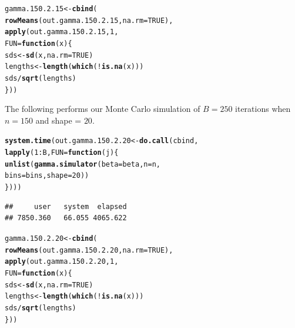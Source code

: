 \documentclass[11pt]{article}\usepackage[]{graphicx}\usepackage[]{color}
\makeatletter
\newcommand{\hlnum}[1]{\textcolor[rgb]{0.686,0.059,0.569}{#1}}%
\newcommand{\hlopt}[1]{\textcolor[rgb]{0,0,0}{#1}}%
\newcommand{\hlstd}[1]{\textcolor[rgb]{0.345,0.345,0.345}{#1}}%
\newcommand{\hlkwa}[1]{\textcolor[rgb]{0.161,0.373,0.58}{\textbf{#1}}}%
\newcommand{\hlkwb}[1]{\textcolor[rgb]{0.69,0.353,0.396}{#1}}%
\newcommand{\hlkwc}[1]{\textcolor[rgb]{0.333,0.667,0.333}{#1}}%
\newcommand{\hlkwd}[1]{\textcolor[rgb]{0.737,0.353,0.396}{\textbf{#1}}}%
\newenvironment{kframe}{%
 \def\at@end@of@kframe{}%
 \ifinner\ifhmode%
  \def\at@end@of@kframe{\end{minipage}}%
  \begin{minipage}{\columnwidth}%
 \fi\fi%
 \def\FrameCommand##1{\hskip\@totalleftmargin \hskip-\fboxsep
 \colorbox{shadecolor}{##1}\hskip-\fboxsep
     \hskip-\linewidth \hskip-\@totalleftmargin \hskip\columnwidth}%
 \MakeFramed {\advance\hsize-\width
   \@totalleftmargin\z@ \linewidth\hsize
   \@setminipage}}%
 {\par\unskip\endMakeFramed%
 \at@end@of@kframe}
\newenvironment{knitrout}{}{} %
\makeatother
\begin{document}
\begin{knitrout}
\color{fgcolor}\begin{kframe}
\begin{alltt}
\hlstd{gamma.150.2.15} \hlkwb{<-} \hlkwd{cbind}\hlstd{(}
  \hlkwd{rowMeans}\hlstd{(out.gamma.150.2.15,} \hlkwc{na.rm} \hlstd{=} \hlnum{TRUE}\hlstd{),}
  \hlkwd{apply}\hlstd{(out.gamma.150.2.15,} \hlnum{1}\hlstd{,}
  \hlkwc{FUN} \hlstd{=} \hlkwa{function}\hlstd{(}\hlkwc{x}\hlstd{)\{}
    \hlstd{sds} \hlkwb{<-} \hlkwd{sd}\hlstd{(x,} \hlkwc{na.rm} \hlstd{=} \hlnum{TRUE}\hlstd{)}
    \hlstd{lengths} \hlkwb{<-} \hlkwd{length}\hlstd{(}\hlkwd{which}\hlstd{(}\hlopt{!}\hlkwd{is.na}\hlstd{(x)))}
    \hlstd{sds} \hlopt{/} \hlkwd{sqrt}\hlstd{(lengths)}
  \hlstd{\}))}
\end{alltt}
\end{kframe}
\end{knitrout}

The following performs our Monte Carlo simulation of $B = 250$ iterations 
when $n = 150$ and shape = $20$.

\begin{knitrout}
\color{fgcolor}\begin{kframe}
\begin{alltt}
\hlkwd{system.time}\hlstd{(out.gamma.150.2.20} \hlkwb{<-} \hlkwd{do.call}\hlstd{(cbind,}
  \hlkwd{lapply}\hlstd{(}\hlnum{1}\hlopt{:}\hlstd{B,} \hlkwc{FUN} \hlstd{=} \hlkwa{function}\hlstd{(}\hlkwc{j}\hlstd{)\{}
    \hlkwd{unlist}\hlstd{(}\hlkwd{gamma.simulator}\hlstd{(}\hlkwc{beta} \hlstd{= beta,} \hlkwc{n} \hlstd{= n,}
      \hlkwc{bins} \hlstd{= bins,} \hlkwc{shape} \hlstd{=} \hlnum{20}\hlstd{))}
\hlstd{\})))}
\end{alltt}
\begin{verbatim}
##     user   system  elapsed 
## 7850.360   66.055 4065.622
\end{verbatim}
\end{kframe}
\end{knitrout}

\begin{knitrout}
\color{fgcolor}\begin{kframe}
\begin{alltt}
\hlstd{gamma.150.2.20} \hlkwb{<-} \hlkwd{cbind}\hlstd{(}
  \hlkwd{rowMeans}\hlstd{(out.gamma.150.2.20,} \hlkwc{na.rm} \hlstd{=} \hlnum{TRUE}\hlstd{),}
  \hlkwd{apply}\hlstd{(out.gamma.150.2.20,} \hlnum{1}\hlstd{,}
  \hlkwc{FUN} \hlstd{=} \hlkwa{function}\hlstd{(}\hlkwc{x}\hlstd{)\{}
    \hlstd{sds} \hlkwb{<-} \hlkwd{sd}\hlstd{(x,} \hlkwc{na.rm} \hlstd{=} \hlnum{TRUE}\hlstd{)}
    \hlstd{lengths} \hlkwb{<-} \hlkwd{length}\hlstd{(}\hlkwd{which}\hlstd{(}\hlopt{!}\hlkwd{is.na}\hlstd{(x)))}
    \hlstd{sds} \hlopt{/} \hlkwd{sqrt}\hlstd{(lengths)}
  \hlstd{\}))}
\end{alltt}
\end{kframe}
\end{knitrout}
\end{document}
